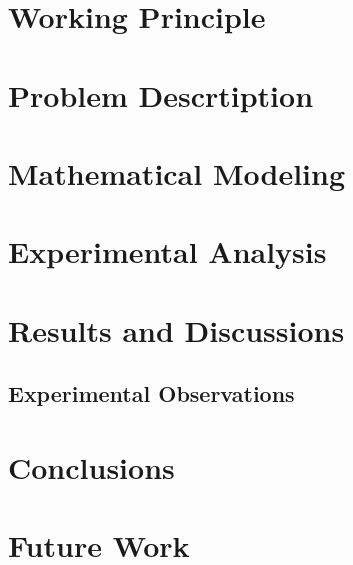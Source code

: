 \documentclass[a4paper,twoside,12pt]{article}
\begin{document}
\section{Working Principle}

\section{Problem Descrtiption}


\section{Mathematical Modeling}


\section{Experimental Analysis}


\section{Results and Discussions}


\subsection{Experimental Observations}



\section{Conclusions}

\section{Future Work}





%
%
\end{document}
